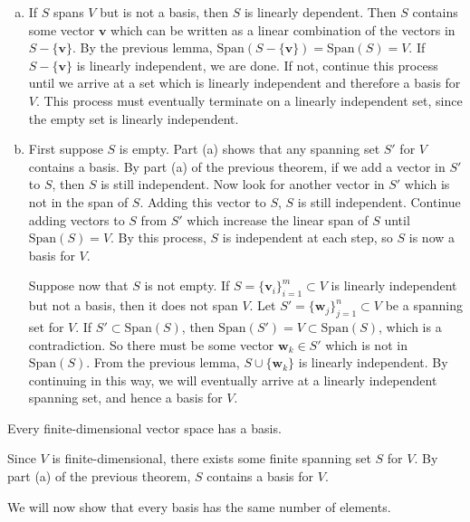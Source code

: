 \documentclass[12pt,letterpaper,reqno]{article}
\numberwithin{equation}{section}
\newcommand{\bv}{\mathbf{v}}
\newcommand{\bw}{\mathbf{w}}
\begin{document}
\begin{pf}
	\begin{enumerate}[(a)]
		\item If $S$ spans $V$ but is not a basis, then $S$ is linearly dependent. Then $S$ contains some vector $\bv$ which can be written as a linear combination of the vectors in $S-\{\bv\}$. By the previous lemma, $\text{Span}(S-\{\bv\})=\text{Span}(S)=V$. If $S-\{\bv\}$ is linearly independent, we are done. If not, continue this process until we arrive at a set which is linearly independent and therefore a basis for $V$. This process must eventually terminate on a linearly independent set, since the empty set is linearly independent.
		\item First suppose $S$ is empty. Part (a) shows that any spanning set $S'$ for $V$ contains a basis. By part (a) of the previous theorem, if we add a vector in $S'$ to $S$, then $S$ is still independent. Now look for another vector in $S'$ which is not in the span of $S$. Adding this vector to $S$, $S$ is still independent. Continue adding vectors to $S$ from $S'$ which increase the linear span of $S$ until $\text{Span}(S)=V$. By this process, $S$ is independent at each step, so $S$ is now a basis for $V$.  
		
		Suppose now that $S$ is not empty. If $S=\{\bv_i\}_{i=1}^m\subset V$ is linearly independent but not  a basis, then it does not span $V$. Let $S'=\{\bw_j\}_{j=1}^n \subset V$ be a spanning set for $V$. If $S' \subset \text{Span}(S)$, then $\text{Span}(S')=V \subset \text{Span}(S)$, which is a contradiction. So there must be some vector $\bw_k \in S'$ which is not in $\text{Span}(S)$. From the previous lemma, $S\cup \{\bw_k\}$ is linearly independent. By continuing in this way, we will eventually arrive at a linearly independent spanning set, and hence a basis for $V$.
	\end{enumerate}
\end{pf}

\begin{cor}
	Every finite-dimensional vector space has a basis.
\end{cor}

\begin{pf}
	Since $V$ is finite-dimensional, there exists some finite spanning set $S$ for $V$. By part (a) of the previous theorem, $S$ contains a basis for $V$.
\end{pf}

We will now show that every basis has the same number of elements.
\end{document}
